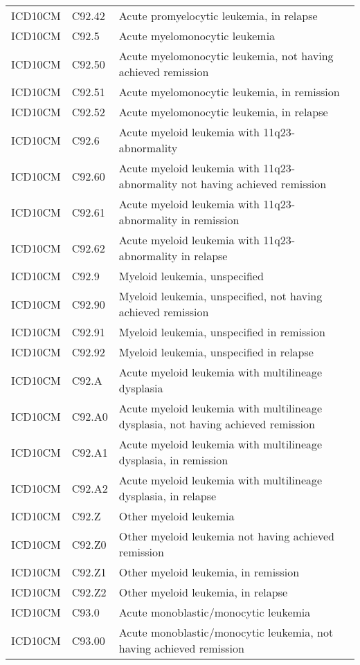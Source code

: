 \begin{longtable}{p{}p{}p{}}
  ICD10CM & C92.42 & Acute promyelocytic leukemia, in relapse \\ 
  ICD10CM & C92.5 & Acute myelomonocytic leukemia \\ 
  ICD10CM & C92.50 & Acute myelomonocytic leukemia, not having achieved remission \\ 
  ICD10CM & C92.51 & Acute myelomonocytic leukemia, in remission \\ 
  ICD10CM & C92.52 & Acute myelomonocytic leukemia, in relapse \\ 
  ICD10CM & C92.6 & Acute myeloid leukemia with 11q23-abnormality \\ 
  ICD10CM & C92.60 & Acute myeloid leukemia with 11q23-abnormality not having achieved remission \\ 
  ICD10CM & C92.61 & Acute myeloid leukemia with 11q23-abnormality in remission \\ 
  ICD10CM & C92.62 & Acute myeloid leukemia with 11q23-abnormality in relapse \\ 
  ICD10CM & C92.9 & Myeloid leukemia, unspecified \\ 
  ICD10CM & C92.90 & Myeloid leukemia, unspecified, not having achieved remission \\ 
  ICD10CM & C92.91 & Myeloid leukemia, unspecified in remission \\ 
  ICD10CM & C92.92 & Myeloid leukemia, unspecified in relapse \\ 
  ICD10CM & C92.A & Acute myeloid leukemia with multilineage dysplasia \\ 
  ICD10CM & C92.A0 & Acute myeloid leukemia with multilineage dysplasia, not having achieved remission \\ 
  ICD10CM & C92.A1 & Acute myeloid leukemia with multilineage dysplasia, in remission \\ 
  ICD10CM & C92.A2 & Acute myeloid leukemia with multilineage dysplasia, in relapse \\ 
  ICD10CM & C92.Z & Other myeloid leukemia \\ 
  ICD10CM & C92.Z0 & Other myeloid leukemia not having achieved remission \\ 
  ICD10CM & C92.Z1 & Other myeloid leukemia, in remission \\ 
  ICD10CM & C92.Z2 & Other myeloid leukemia, in relapse \\ 
  ICD10CM & C93.0 & Acute monoblastic/monocytic leukemia \\ 
  ICD10CM & C93.00 & Acute monoblastic/monocytic leukemia, not having achieved remission \\ 

\end{longtable}
